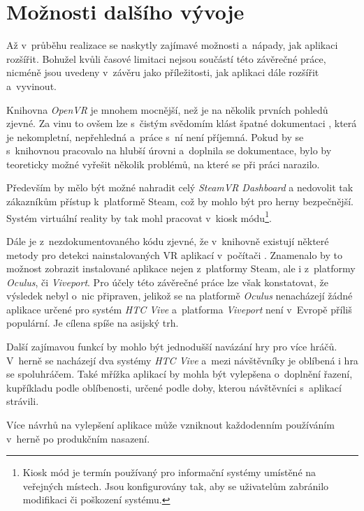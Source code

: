 \section{Možnosti dalšího
vývoje}\label{moux17enosti-dalux161uxedho-vuxfdvoje}

Až v~průběhu realizace se naskytly zajímavé možnosti a~nápady, jak
aplikaci rozšířit. Bohužel kvůli časové limitaci nejsou součástí této
závěrečné práce, nicméně jsou uvedeny v~závěru jako příležitosti, jak
aplikaci dále rozšířit a~vyvinout.

Knihovna \emph{OpenVR} je mnohem mocnější, než je na několik prvních pohledů
zjevné. Za vinu to ovšem lze s~čistým svědomím klást špatné dokumentaci \autocite{openvrdocs},
která je nekompletní, nepřehledná a~práce s~ní není příjemná. Pokud by
se s~knihovnou pracovalo na hlubší úrovni a~doplnila se dokumentace,
bylo by teoreticky možné vyřešit několik problémů, na které se při práci narazilo.

Především by mělo být možné nahradit celý \emph{SteamVR Dashboard} a
nedovolit tak zákazníkům přístup k~platformě Steam, což by mohlo být pro
herny bezpečnější. Systém virtuální reality by tak mohl pracovat
v~kiosk módu\footnote{Kiosk mód je termín používaný pro informační systémy umístěné na veřejných místech. Jsou konfigurovány tak, aby se uživatelům zabránilo modifikaci či poškození systému.}. 

Dále je z~nezdokumentovaného kódu zjevné, že
v~knihovně existují některé metody pro detekci nainstalovaných VR
aplikací v~počítači \autocite{openvrhidden}. Znamenalo by to možnost zobrazit instalované aplikace
nejen z~platformy Steam, ale i z~platformy \emph{Oculus}, či \emph{Viveport}. Pro
účely této závěrečné práce lze však konstatovat, že výsledek nebyl o~nic
připraven, jelikož se na platformě \emph{Oculus} nenacházejí žádné aplikace
určené pro systém \emph{HTC Vive} a~platforma \emph{Viveport} není v~Evropě příliš
populární. Je cílena spíše na asijský trh. \autocite{viveportasia}

Další zajímavou funkcí by mohlo být jednodušší navázání hry pro více
hráčů. V~herně se nacházejí dva systémy \emph{HTC Vive} a~mezi návštěvníky je
oblíbená i hra se spoluhráčem. Také mřížka aplikací by mohla být vylepšena
o~doplnění řazení, kupříkladu podle oblíbenosti, určené podle doby, kterou
návštěvníci s~aplikací strávili.

Více návrhů na vylepšení aplikace může vzniknout každodenním používáním
v~herně po produkčním nasazení.
